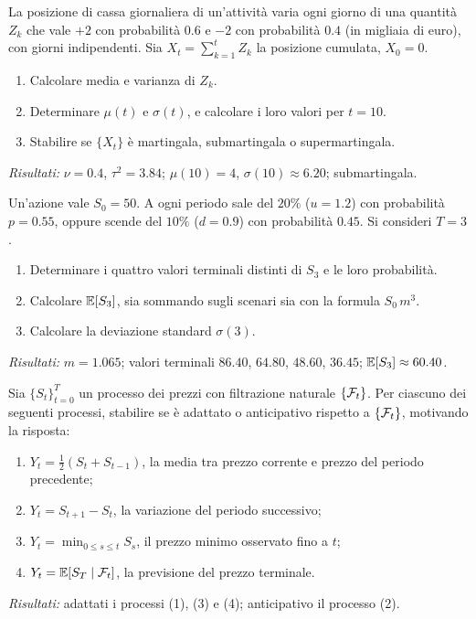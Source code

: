 \begin{exercise}
\label{ex:prop-rw}
La posizione di cassa giornaliera di un'attivit\`{a} varia ogni giorno
di una quantit\`{a} $Z_k$ che vale $+2$ con probabilit\`{a} $0.6$ e
$-2$ con probabilit\`{a} $0.4$ (in migliaia di euro), con giorni
indipendenti. Sia $X_t=\sum_{k=1}^{t}Z_k$ la posizione cumulata,
$X_0=0$.
\begin{enumerate}
\item Calcolare media e varianza di $Z_k$.
\item Determinare $\mu(t)$ e $\sigma(t)$, e calcolare i loro valori
per $t=10$.
\item Stabilire se $\{X_t\}$ \`{e} martingala, submartingala o
supermartingala.
\end{enumerate}
\textit{Risultati:} $\nu=0.4$, $\tau^2=3.84$; $\mu(10)=4$,
$\sigma(10)\approx 6.20$; submartingala.
\end{exercise}

\begin{exercise}
\label{ex:prop-binomiale}
Un'azione vale $S_0=50$. A ogni periodo sale del $20\%$ ($u=1.2$) con
probabilit\`{a} $p=0.55$, oppure scende del $10\%$ ($d=0.9$) con
probabilit\`{a} $0.45$. Si consideri $T=3$.
\begin{enumerate}
\item Determinare i quattro valori terminali distinti di $S_3$ e le
loro probabilit\`{a}.
\item Calcolare $\mathbb{E}[S_3]$, sia sommando sugli scenari sia con la
formula $S_0\,m^3$.
\item Calcolare la deviazione standard $\sigma(3)$.
\end{enumerate}
\textit{Risultati:} $m=1.065$; valori terminali $86.40$, $64.80$,
$48.60$, $36.45$; $\mathbb{E}[S_3]\approx 60.40$.
\end{exercise}

\begin{exercise}
\label{ex:prop-adattato}
Sia $\{S_t\}_{t=0}^{T}$ un processo dei prezzi con filtrazione
naturale $\{\mathcal{F}_t\}$. Per ciascuno dei seguenti processi, stabilire se
\`{e} adattato o anticipativo rispetto a $\{\mathcal{F}_t\}$, motivando la
risposta:
\begin{enumerate}
\item $Y_t=\tfrac{1}{2}(S_t+S_{t-1})$, la media tra prezzo corrente e
prezzo del periodo precedente;
\item $Y_t=S_{t+1}-S_t$, la variazione del periodo successivo;
\item $Y_t=\min_{0\leq s\leq t}S_s$, il prezzo minimo osservato fino
a $t$;
\item $Y_t=\mathbb{E}[S_T\mid\mathcal{F}_t]$, la previsione del prezzo terminale.
\end{enumerate}
\textit{Risultati:} adattati i processi (1), (3) e (4); anticipativo
il processo (2).
\end{exercise}

